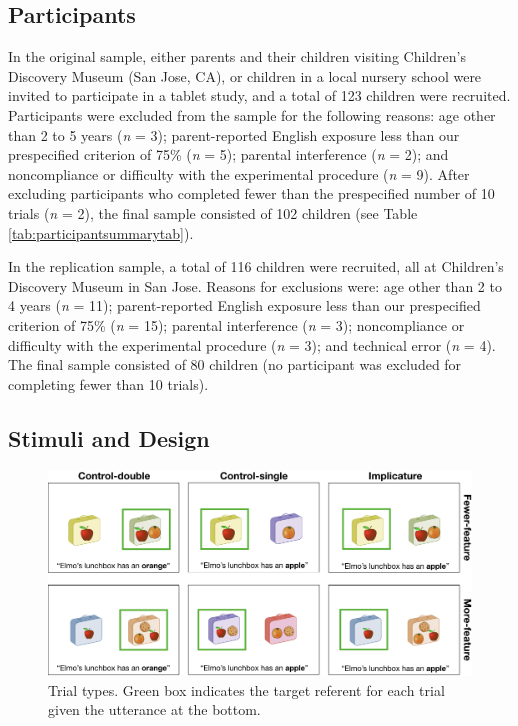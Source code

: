 \documentclass[man]{apa6}
\theoremstyle{definition}
\theoremstyle{definition}
\theoremstyle{definition}
\theoremstyle{remark}
\begin{document}
\subsection{Participants}\label{participants}

In the original sample, either parents and their children visiting
Children's Discovery Museum (San Jose, CA), or children in a local
nursery school were invited to participate in a tablet study, and a
total of 123 children were recruited. Participants were excluded from
the sample for the following reasons: age other than 2 to 5 years
(\emph{n} = 3); parent-reported English exposure less than our
prespecified criterion of 75\% (\emph{n} = 5); parental interference
(\emph{n} = 2); and noncompliance or difficulty with the experimental
procedure (\emph{n} = 9). After excluding participants who completed
fewer than the prespecified number of 10 trials (\emph{n} = 2), the
final sample consisted of 102 children (see Table
\ref{tab:participantsummarytab}).

In the replication sample, a total of 116 children were recruited, all
at Children's Discovery Museum in San Jose. Reasons for exclusions were:
age other than 2 to 4 years (\emph{n} = 11); parent-reported English
exposure less than our prespecified criterion of 75\% (\emph{n} = 15);
parental interference (\emph{n} = 3); noncompliance or difficulty with
the experimental procedure (\emph{n} = 3); and technical error (\emph{n}
= 4). The final sample consisted of 80 children (no participant was
excluded for completing fewer than 10 trials).

\subsection{Stimuli and Design}\label{stimuli-and-design}

\begin{figure}
\includegraphics[width=5.98in]{figs/stimuli} \caption{Trial types. Green box indicates the target referent for each trial given the utterance at the bottom.}\label{fig:stimuli}
\end{figure}
\end{document}
